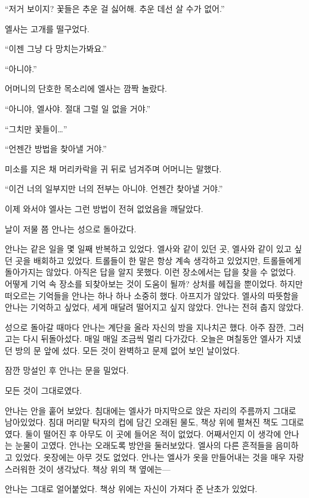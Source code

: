 ``저거 보이지? 꽃들은 추운 걸 싫어해. 추운 데선 살 수가 없어.''

엘사는 고개를 떨구었다.

``이젠 그냥 다 망치는가봐요.''

``아니야.''

어머니의 단호한 목소리에 엘사는 깜짝 놀랐다.

``아니야, 엘사야. 절대 그럴 일 없을 거야.''

``그치만 꽃들이\ldots''

``언젠간 방법을 찾아낼 거야.''

미소를 지은 채 머리카락을 귀 뒤로 넘겨주며 어머니는 말했다.

``이건 너의 일부지만 너의 전부는 아니야. 언젠간 찾아낼 거야.''

이제 와서야 엘사는 그런 방법이 전혀 없었음을 깨달았다.

\textbreak

날이 저물 쯤 안나는 성으로 돌아갔다.

안나는 같은 일을 몇 일째 반복하고 있었다. 엘사와 같이 있던 곳, 엘사와 같이 있고 싶던 곳을 배회하고 있었다. 트롤들이 한 말은 항상 계속 생각하고 있었지만, 트롤들에게 돌아가지는 않았다. 아직은 답을 알지 못했다. 이런 장소에서는 답을 찾을 수 없었다. 어떻게 기억 속 장소를 되찾아보는 것이 도움이 될까? 상처를 헤집을 뿐이었다. 하지만 떠오르는 기억들을 안나는 하나 하나 소중히 했다. 아프지가 않았다. 엘사의 따뜻함을 안나는 기억하고 싶었다, 세게 매달려 떨어지고 싶지 않았다. 안나는 전혀 춥지 않았다.

성으로 돌아갈 때마다 안나는 계단을 올라 자신의 방을 지나치곤 했다. 아주 잠깐, 그러고는 다시 뒤돌아섰다. 매일 매일 조금씩 멀리 다가갔다. 오늘은 며칠동안 엘사가 지냈던 방의 문 앞에 섰다. 모든 것이 완벽하고 문제 없어 보인 날이었다.

잠깐 망설인 후 안나는 문을 밀었다.


모든 것이 그대로였다.

안나는 안을 훝어 보았다. 침대에는 엘사가 마지막으로 앉은 자리의 주름까지 그대로 남아있었다. 침대 머리맡 탁자의 컵에 담긴 오래된 물도, 책상 위에 펼쳐진 책도 그대로였다. 둘이 떨어진 후 아무도 이 곳에 들어온 적이 없었다. 어째서인지 이 생각에 안나는 눈물이 고였다. 안나는 오래도록 방안을 둘러보았다. 엘사의 다른 흔적들을 음미하고 있었다. 옷장에는 아무 것도 없었다. 안나는 엘사가 옷을 만들어내는 것을 매우 자랑스러워한 것이 생각났다. 책상 위의 책 옆에는—

안나는 그대로 얼어붙었다. 책상 위에는 자신이 가져다 준 난초가 있었다.

